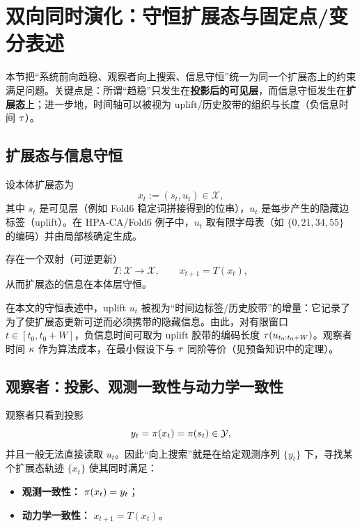 \section{双向同时演化：守恒扩展态与固定点/变分表述}

本节把“系统前向趋稳、观察者向上搜索、信息守恒”统一为同一个扩展态上的约束满足问题。关键点是：所谓“趋稳”只发生在\textbf{投影后的可见层}，而信息守恒发生在\textbf{扩展态}上；进一步地，时间轴可以被视为 uplift/历史胶带的组织与长度（负信息时间 \(\tau\)）。

\subsection{扩展态与信息守恒}

设本体扩展态为
\[
x_t:=(s_t,u_t)\in\mathcal X,
\]
其中 \(s_t\) 是可见层（例如 Fold6 稳定词拼接得到的位串），\(u_t\) 是每步产生的隐藏边标签（uplift）。在 HPA-CA/Fold6 例子中，\(u_t\) 取有限字母表（如 \(\{0,21,34,55\}\) 的编码）并由局部核确定生成。

\begin{assumption}[守恒演化]
存在一个双射（可逆更新）
\[
T:\mathcal X\to\mathcal X,\qquad x_{t+1}=T(x_t),
\]
从而扩展态的信息在本体层守恒。
\end{assumption}

\begin{definition}
在本文的守恒表述中，uplift \(u_t\) 被视为“时间边标签/历史胶带”的增量：它记录了为了使扩展态更新可逆而必须携带的隐藏信息。由此，对有限窗口 \(t\in[t_0,t_0+W]\)，负信息时间可取为 uplift 胶带的编码长度 \(\tau(u_{t_0:t_0+W})\)。观察者时间 \(\kappa\) 作为算法成本，在最小假设下与 \(\tau\) 同阶等价（见预备知识中的定理）。
\end{definition}

\subsection{观察者：投影、观测一致性与动力学一致性}

观察者只看到投影
\[
y_t=\pi(x_t)=\pi(s_t)\in\mathcal Y,
\]
并且一般无法直接读取 \(u_t\)。因此“向上搜索”就是在给定观测序列 \(\{y_t\}\) 下，寻找某个扩展态轨迹 \(\{x_t\}\) 使其同时满足：
\begin{itemize}
  \item \textbf{观测一致性：} \(\pi(x_t)=y_t\)；
  \item \textbf{动力学一致性：} \(x_{t+1}=T(x_t)\)。
\end{itemize}

